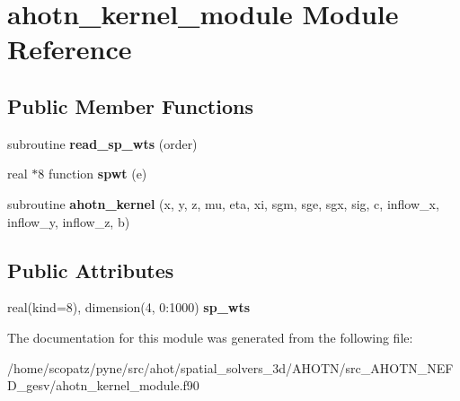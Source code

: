 \hypertarget{classahotn__kernel__module}{\section{ahotn\-\_\-kernel\-\_\-module Module Reference}
\label{classahotn__kernel__module}
}
\subsection*{Public Member Functions}
\begin{DoxyCompactItemize}
\item 
\hypertarget{classahotn__kernel__module_a0020d1d5b3a3b3531a8558a277021df7}{subroutine {\bfseries read\-\_\-sp\-\_\-wts} (order)}\label{classahotn__kernel__module_a0020d1d5b3a3b3531a8558a277021df7}

\item 
\hypertarget{classahotn__kernel__module_a39dd68d19fb10ecf5cc99e3a985d9954}{real $\ast$8 function {\bfseries spwt} (e)}\label{classahotn__kernel__module_a39dd68d19fb10ecf5cc99e3a985d9954}

\item 
\hypertarget{classahotn__kernel__module_a63aa1d735806357cca2481808d55aa7a}{subroutine {\bfseries ahotn\-\_\-kernel} (x, y, z, mu, eta, xi, sgm, sge, sgx, sig, c, inflow\-\_\-x, inflow\-\_\-y, inflow\-\_\-z, b)}\label{classahotn__kernel__module_a63aa1d735806357cca2481808d55aa7a}

\end{DoxyCompactItemize}
\subsection*{Public Attributes}
\begin{DoxyCompactItemize}
\item 
\hypertarget{classahotn__kernel__module_abaac07572f901adbba93f9b955fb4e88}{real(kind=8), dimension(4, 0\-:1000) {\bfseries sp\-\_\-wts}}\label{classahotn__kernel__module_abaac07572f901adbba93f9b955fb4e88}

\end{DoxyCompactItemize}


The documentation for this module was generated from the following file\-:\begin{DoxyCompactItemize}
\item 
/home/scopatz/pyne/src/ahot/spatial\-\_\-solvers\-\_\-3d/\-A\-H\-O\-T\-N/src\-\_\-\-A\-H\-O\-T\-N\-\_\-\-N\-E\-F\-D\-\_\-gesv/ahotn\-\_\-kernel\-\_\-module.\-f90\end{DoxyCompactItemize}
